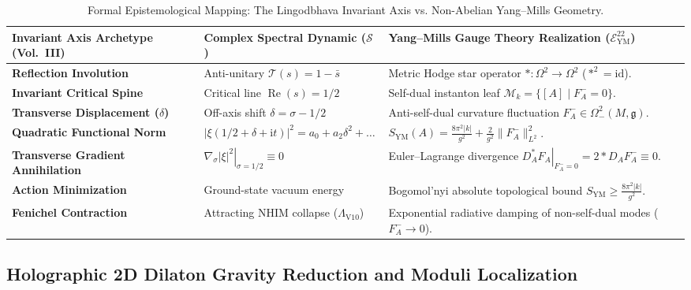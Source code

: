 \documentclass[11pt,a4paper,reqno]{article}
\theoremstyle{plain}
\theoremstyle{definition}
\theoremstyle{remark}
\numberwithin{equation}{section}
\newcommand{\Eym}{\mathcal{E}_{\mathrm{YM}}^{22}}
\begin{document}
\begin{table}[htbp]
\centering
\caption{Formal Epistemological Mapping: The Lingodbhava Invariant Axis vs. Non-Abelian Yang--Mills Geometry.}
\label{tab:ym_archetypal_mapping}
\footnotesize
\renewcommand{\arraystretch}{1.25}
\begin{tabularx}{\textwidth}{@{}P{3.8cm}P{4.2cm}Y@{}}
\toprule
\textbf{Invariant Axis Archetype (Vol.~III)} & \textbf{Complex Spectral Dynamic ($\mathcal{S}$)} & \textbf{Yang--Mills Gauge Theory Realization ($\Eym$)} \\
\midrule
\textbf{Reflection Involution} & Anti-unitary $\mathcal{T}(s) = 1 - \bar{s}$ & Metric Hodge star operator $*: \Omega^2 \to \Omega^2$ ($*^2 = \mathrm{id}$). \\
\textbf{Invariant Critical Spine} & Critical line $\operatorname{Re}(s) = 1/2$ & Self-dual instanton leaf $\mathcal{M}_k = \{ [A] \mid F_A^- = 0 \}$. \\
\textbf{Transverse Displacement ($\delta$)} & Off-axis shift $\delta = \sigma - 1/2$ & Anti-self-dual curvature fluctuation $F_A^- \in \Omega^2_-(M, \mathfrak{g})$. \\
\textbf{Quadratic Functional Norm} & $|\xi(1/2+\delta+\mathrm{i}t)|^2 = a_0 + a_2\delta^2 + \dots$ & $S_{\mathrm{YM}}(A) = \frac{8\pi^2|k|}{g^2} + \frac{2}{g^2}\|F_A^-\|_{L^2}^2$. \\
\textbf{Transverse Gradient Annihilation} & $\left.\nabla_\sigma |\xi|^2\right|_{\sigma = 1/2} \equiv 0$ & Euler--Lagrange divergence $\left. D_A^* F_A \right|_{F_A^- = 0} = 2 *D_A F_A^- \equiv 0$. \\
\textbf{Action Minimization} & Ground-state vacuum energy & Bogomol'nyi absolute topological bound $S_{\mathrm{YM}} \ge \frac{8\pi^2 |k|}{g^2}$. \\
\textbf{Fenichel Contraction} & Attracting NHIM collapse ($\Lambda_{\mathrm{V10}}$) & Exponential radiative damping of non-self-dual modes ($F_A^- \to 0$). \\
\bottomrule
\end{tabularx}
\end{table}

\subsection{Holographic 2D Dilaton Gravity Reduction and Moduli Localization}
\label{subsec:dilaton_reduction_ym}
\end{document}
